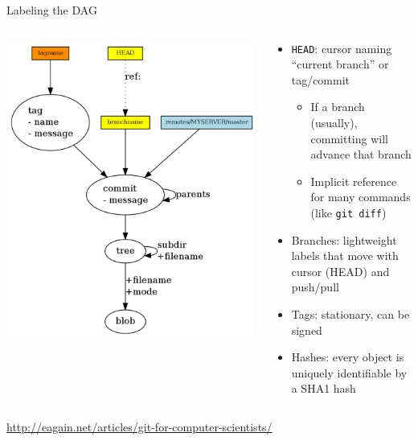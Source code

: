 \documentclass{beamer}
\begin{document}
\begin{frame}{Labeling the DAG}
  \begin{columns}
    \begin{column}{0.5\textwidth}
      \includegraphics[width=\textwidth]{figures/Git/git-storage.png} \\
    \end{column}
    \begin{column}{0.5\textwidth}
      \begin{itemize}
      \item {\tt HEAD}: cursor naming ``current branch'' or tag/commit
        \begin{itemize}
        \item If a branch (usually), committing will advance that branch
        \item Implicit reference for many commands (like \texttt{git diff})
        \end{itemize}
      \item Branches: lightweight labels that move with cursor (HEAD) and push/pull
      \item Tags: stationary, can be signed
      \item Hashes: every object is uniquely identifiable by a SHA1 hash
      \end{itemize}
    \end{column}
  \end{columns}
  {\tiny \url{http://eagain.net/articles/git-for-computer-scientists/}}
\end{frame}
\end{document}
